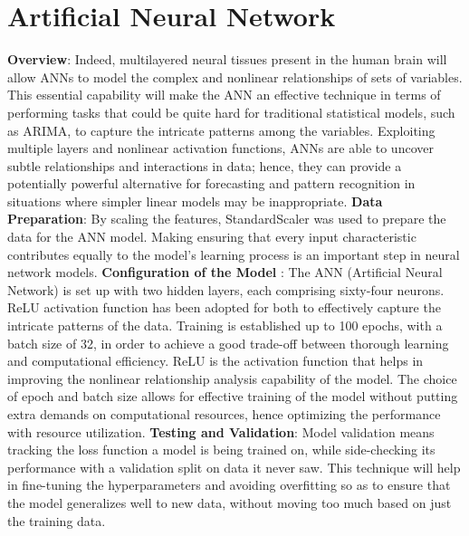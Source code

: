 \documentclass[12pt, a4paper,twoside]{report}
\theoremstyle{plain} %
\theoremstyle{definition} %
\theoremstyle{remark} %
\numberwithin{equation}{chapter}
\begin{document}
\section{Artificial Neural Network}\label{sec:3.5}
\textbf{Overview}:
\newline
Indeed, multilayered neural tissues present in the human brain will allow ANNs to model the complex and nonlinear relationships of sets of variables. This essential capability will make the ANN an effective technique in terms of performing tasks that could be quite hard for traditional statistical models, such as ARIMA, to capture the intricate patterns among the variables. Exploiting multiple layers and nonlinear activation functions, ANNs are able to uncover subtle relationships and interactions in data; hence, they can provide a potentially powerful alternative for forecasting and pattern recognition in situations where simpler linear models may be inappropriate.
\newline
\textbf{Data Preparation}:
\newline
By scaling the features, StandardScaler was used to prepare the data for the ANN model. Making ensuring that every input characteristic contributes equally to the model's learning process is an important step in neural network models.
\newline
\textbf{Configuration of the Model }:
\newline
The ANN (Artificial Neural Network) is set up with two hidden layers, each comprising sixty-four neurons. ReLU activation function has been adopted for both to effectively capture the intricate patterns of the data. Training is established up to 100 epochs, with a batch size of 32, in order to achieve a good trade-off between thorough learning and computational efficiency. ReLU is the activation function that helps in improving the nonlinear relationship analysis capability of the model. The choice of epoch and batch size allows for effective training of the model without putting extra demands on computational resources, hence optimizing the performance with resource utilization.
\newline
\textbf{Testing and Validation}:
\newline
Model validation means tracking the loss function a model is being trained on, while side-checking its performance with a validation split on data it never saw. This technique will help in fine-tuning the hyperparameters and avoiding overfitting so as to ensure that the model generalizes well to new data, without moving too much based on just the training data.
\end{document}

